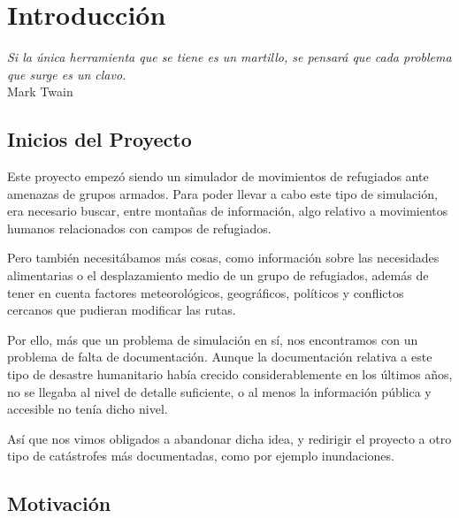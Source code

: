 
\chapter*{Introducción} \label{cap0}


\begin{flushright}
\begin{minipage}{7.85cm}
    {\em Si la única herramienta que se tiene es un martillo, se pensará que
    cada problema que surge es un clavo.} \\  Mark Twain
\end{minipage}
\end{flushright}

\vspace*{5mm}

\section*{Inicios del Proyecto}

Este proyecto empezó siendo un simulador de movimientos de refugiados ante
amenazas de grupos armados. Para poder llevar a cabo este tipo de simulación,
era necesario buscar, entre montañas de información, algo relativo a movimientos
humanos relacionados con campos de refugiados.

Pero también necesitábamos más cosas, como información sobre las necesidades
alimentarias o el desplazamiento medio de un grupo de refugiados, además de
tener en cuenta factores meteorológicos, geográficos, políticos y conflictos
cercanos que pudieran modificar las rutas.

Por ello, más que un problema de simulación en sí, nos encontramos con un
problema de falta de documentación. Aunque la documentación relativa a este tipo
de desastre humanitario había crecido considerablemente en los últimos años,
no se llegaba al nivel de detalle suficiente, o al menos la información pública
y accesible no tenía dicho nivel.

Así que nos vimos obligados a abandonar dicha idea, y redirigir el proyecto a
otro tipo de catástrofes más documentadas, como por ejemplo inundaciones.

\section*{Motivación}

